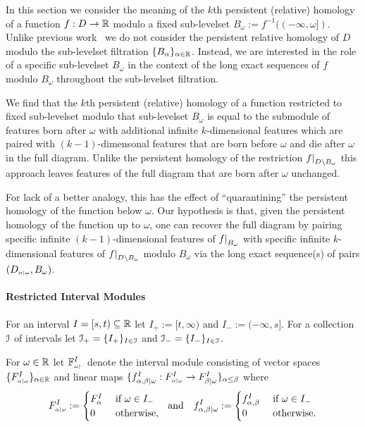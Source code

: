 
In this section we consider the meaning of the $k$th persistent (relative) homology of a function $f : D\to \mathbb{R}$ modulo a fixed sub-levelset $B_\omega := f^{-1}((-\infty,\omega])$.
Unlike previous work~\cite{extendedpersistence} we do not consider the persistent relative homology of $D$ modulo the sub-levelset filtration $\{B_\alpha\}_{\alpha\in\mathbb{R}}$.
Instead, we are interested in the role of a specific sub-levelset $B_\omega$ in the context of the long exact sequences of $f$ modulo $B_\omega$ throughout the sub-levelset filtration.

We find that the $k$th persistent (relative) homology of a function restricted to fixed sub-levelset modulo that sub-levelset $B_\omega$ is equal to the submodule of features born after $\omega$ with additional infinite $k$-dimensional features which are paired with $(k-1)$-dimensonal features that are born before $\omega$ and die after $\omega$ in the full diagram.
Unlike the persistent homology of the restriction $f\mathord{\mid}_{D\setminus B_\omega}$ this approach leaves features of the full diagram that are born after $\omega$ unchanged.

For lack of a better analogy, this has the effect of ``quarantining'' the persistent homology of the function below $\omega$.
Our hypothesis is that, given the persistent homology of the function up to $\omega$, one can recover the full diagram by pairing specific infinite $(k-1)$-dimensional features of $f\mathord{\mid}_{B_\omega}$ with specific infinite $k$-dimensional features of $f\mathord{\mid}_{D\setminus B_\omega}$ modulo $B_\omega$ via the long exact sequence(s) of pairs $(D_{\scriptscriptstyle \alpha\mid \omega}, B_\omega)$.

\paragraph{Restricted Interval Modules}

For an interval $I = [s,t)\subseteq \mathbb{R}$ let $I_+ := [t,\infty)$ and $I_- := (-\infty, s]$.
For a collection $\mathcal{I}$ of intervals let $\mathcal{I}_+ = \{ I_+ \}_{I\in\mathcal{I}}$ and $\mathcal{I}_- = \{ I_- \}_{I\in\mathcal{I}}$.

For $\omega\in\mathbb{R}$ let $\mathbb{F}_{\scriptscriptstyle \omega\mid \cdot}^I$ denote the interval module consisting of vector spaces $\{F_{\scriptscriptstyle \alpha\mid \omega}^I\}_{\alpha\in\mathbb{R}}$ and linear maps $\{f_{\alpha,\beta\mid \omega}^I : F_{\scriptscriptstyle \alpha\mid \omega}^I\to F_{\beta\mid\omega}^I\}_{\alpha\leq\beta}$ where
\[ F_{\scriptscriptstyle \alpha\mid \omega}^I := \begin{cases} F_\alpha^I&\text{ if } \omega\in I_-\\ 0&\text{ otherwise,}\end{cases}\ \text{ and }\ \ f_{\alpha,\beta\mid\omega}^I := \begin{cases} f_{\alpha,\beta}^I&\text{ if } \omega\in I_-\\ 0&\text{ otherwise.}\end{cases}\]

